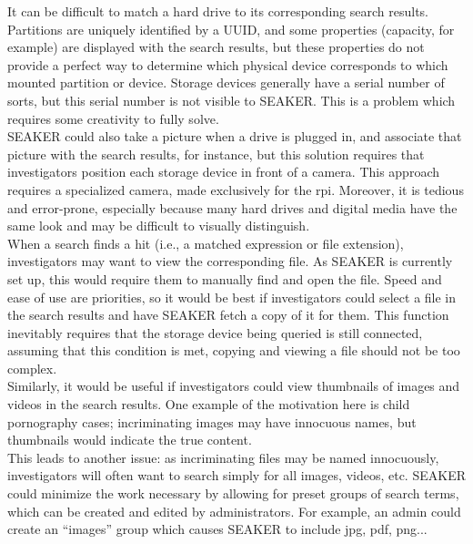 \documentclass[12pt]{article}
\begin{document}
It can be difficult to match a hard drive to its corresponding search results. Partitions are uniquely
identified by a UUID, and some properties (capacity, for example) are displayed with the search results,
but these properties do not provide a perfect way to determine which physical device corresponds to
which mounted partition or device. Storage devices generally have a serial number of sorts, but this
serial number is not visible to SEAKER. This is a problem which requires some creativity to fully solve.\\

SEAKER could also take a picture when a drive is plugged in, and associate that picture with the search
results, for instance, but this solution requires that investigators position each storage device in front of
a camera.  This approach requires a specialized camera, made exclusively for the \gls{rpi}.  Moreover,
it is tedious and error-prone, especially because many hard drives and digital media have the same look
and may be difficult to visually distinguish.\\

When a search finds a hit (i.e., a matched expression or file extension), investigators may want to
view the corresponding file. As SEAKER is currently set up, this would require them to manually find and open the file. Speed
and ease of use are priorities, so it would be best if investigators could select a file in the search results
and have SEAKER fetch a copy of it for them. This function inevitably requires that the storage device
being queried is still connected, assuming that this condition is met, copying and viewing a file should
not be too complex.\\

Similarly, it would be useful if investigators could view thumbnails of images and videos in the search
results. One example of the motivation here is child pornography cases; incriminating images may have
innocuous names, but thumbnails would indicate the true content.\\

This leads to another issue: as incriminating files may be named innocuously, investigators will often
want to search simply for all images, videos, etc. SEAKER could minimize the work necessary by
allowing for preset groups of search terms, which can be created and edited by administrators. For
example, an admin could create an ``images'' group which causes SEAKER to include jpg, pdf, png...\\
\end{document}
